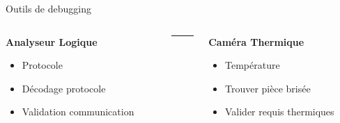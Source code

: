 \begin{frame}[t]{Outils de debugging}
\begin{columns}[T]
        \begin{column}{0.25\textwidth}
            \vspace{-12pt}
            \begin{center}
                \textbf{Analyseur Logique}
            \end{center}
            \begin{itemize}
                \item Protocole
                \bigskip
                \item Décodage protocole
                \item Validation communication
            \end{itemize}
        \end{column}
        \begin{column}{0.001\textwidth}
            \rule{0.1mm}{0.85\textheight}
        \end{column}

        \begin{column}{0.25\textwidth}
            \vspace{-12pt}
            \begin{center}
                \textbf{Caméra Thermique}
            \end{center}
            \begin{itemize}
                \item Température
                \bigskip
                \item Trouver pièce brisée
                \item Valider requis thermiques
            \end{itemize}
        \end{column}
    \end{columns}
    \vspace{-0.25\textwidth}
    \begin{columns}
        \begin{column}{0.25\textwidth}
        \end{column}
        \begin{column}{0.25\textwidth}
        \end{column}
        \begin{column}{0.25\textwidth}
        \end{column}
        \begin{column}{0.25\textwidth}
        \end{column}
    \end{columns}
\end{frame}

